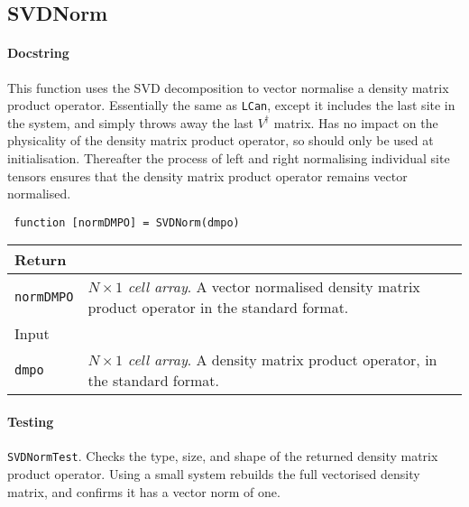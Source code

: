  \subsection{SVDNorm}
 \paragraph{Docstring} This function uses the SVD decomposition to vector normalise a density matrix product operator. Essentially the same as \lstinline$LCan$, except it includes the last site in the system, and simply throws away the last \(V^{\dagger}\) matrix. Has no impact on the physicality of the density matrix product operator, so should only be used at initialisation. Thereafter the process of left and right normalising individual site tensors ensures that the density matrix product operator remains vector normalised. 
 \begin{lstlisting}
 function [normDMPO] = SVDNorm(dmpo) \end{lstlisting}
 \begin{longtabu}{X[1,l]X[4,l]}
 \hline
 Return & \\ \hline
 \lstinline$normDMPO$ & \emph{\(N \times 1\) cell array}. A vector normalised density matrix product operator in the standard format. \\ \hline
 Input & \\ \hline
 \lstinline$dmpo$ & \emph{\(N \times 1\) cell array}. A density matrix product operator, in the standard format. \\ 
 \hline
 \end{longtabu}
 \paragraph{Testing} \lstinline$SVDNormTest$. Checks the type, size, and shape of the returned density matrix product operator. Using a small system rebuilds the full vectorised density matrix, and confirms it has a vector norm of one.  